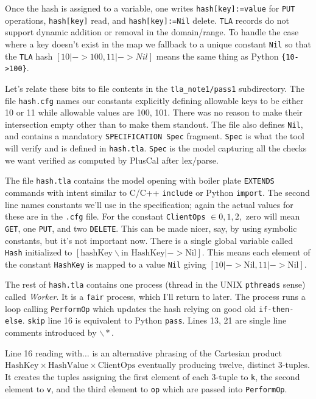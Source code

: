 \documentclass[twocolumn]{article}
\begin{document}
Once the hash is assigned to a variable, one writes \texttt{hash[key]:=value} for \texttt{PUT} operations, \texttt{hash[key]} read, and \texttt{hash[key]:=Nil} delete. \texttt{TLA} records do not support dynamic addition or removal in the domain/range. To handle the case where a key doesn't exist in the map we fallback to a unique constant \texttt{Nil} so that the \texttt{TLA} hash $[10 | -> 100, 11 | -> Nil]$ means the same thing as Python \texttt{\{10->100\}}.
 
Let's relate these bits to file contents in the \texttt{tla\_note1/pass1} subdirectory. The file \texttt{hash.cfg} names our constants explicitly defining allowable keys to be either 10 or 11 while allowable values are 100, 101. There was no reason to make their intersection empty other than to make them standout. The file also defines \texttt{Nil}, and contains a mandatory \texttt{SPECIFICATION Spec} fragment. \texttt{Spec} is what the tool will verify and is defined in \texttt{hash.tla}. \texttt{Spec} is the model capturing all the checks we want verified as computed by PlusCal after lex/parse.

The file \texttt{hash.tla} contains the model opening with boiler plate \texttt{EXTENDS} commands with intent similar to C/C++ \texttt{include} or Python \texttt{import}. The second line names constants we'll use in the specification; again the actual values for these are in the \texttt{.cfg} file. For the constant \texttt{ClientOps} $\in {0,1,2,}$ zero will mean \texttt{GET}, one \texttt{PUT}, and two \texttt{DELETE}. This can be made nicer, say, by using symbolic constants, but it's not important now. There is a single global variable called \texttt{Hash} initialized to $[\text{hashKey} \backslash \text{in HashKey} |-> \text{Nil}]$. This means each element of the constant \texttt{HashKey} is mapped to a value \texttt{Nil} giving $[10 |-> \text{Nil}, 11 |-> \text{Nil}]$.

The rest of \texttt{hash.tla} contains one process (thread in the UNIX \texttt{pthreads} sense) called \emph{Worker}. It is a \texttt{fair} process, which I'll return to later. The process runs a loop calling \texttt{PerformOp} which updates the hash relying on good old \texttt{if-then-else}. \texttt{skip} line 16 is equivalent to Python \texttt{pass}. Lines 13, 21 are single line comments introduced by ${\backslash*}$.

Line 16 reading $\text{with}\ldots$ is an alternative phrasing of the Cartesian product $\text{HashKey} \times \text{HashValue} \times \text{ClientOps}$ eventually producing twelve, distinct 3-tuples. It creates the tuples assigning the first element of each 3-tuple to \texttt{k}, the second element to \texttt{v}, and the third element to \texttt{op} which are passed into \texttt{PerformOp}.
\end{document}
